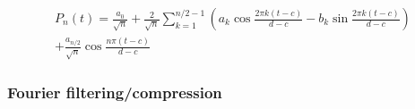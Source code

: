 \begin{gather*}
    P_n(t) = \frac{a_0}{\sqrt{n}}  
    + \frac{2}{\sqrt{n}} \sum_{k=1}^{n/2-1} \left( a_k \cos{\frac{2 \pi k (t-c)}{d-c}} - b_k \sin{\frac{2 \pi k (t-c)}{d-c}} \right) \\
    + \frac{a_{n/2}}{\sqrt{n}} \cos{\frac{n \pi (t-c)}{d-c}}
\end{gather*}

\subsubsection{Fourier filtering/compression}

